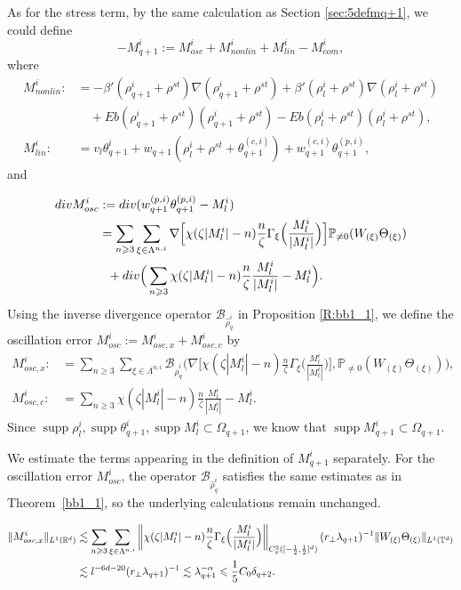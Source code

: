 \documentclass[10pt,a4paper]{amsart}
\numberwithin{equation}{section}
\DeclareMathOperator{\supp}{supp}
\def\[{{\Big[}}
\def\]{{\Big]}}
\def\({{\Big(}}
\def\){{\Big)}}
\newcommand{\norm}[1]{\left\|#1\right\|}
\def\mP{{\mathbb P}}
\def\geq{\geqslant}
\def\leq{\leqslant}
\def\div{\mathord{{\rm div}}}
\def\[{{\Big[}}
\def\]{{\Big]}}
\def\({{\Big(}}
\def\){{\Big)}}
\def\geq{\geqslant}
\def\leq{\leqslant}
\def\div{\mathord{{\rm div}}}
\begin{document}
 
 As for the stress term, by the same calculation as Section \ref{sec:5defmq+1}, we could  define 
$$-{M}^i _{q+1}:=M^i_{osc}+M^i_{nonlin}+M^i_{lin}-M^i_{com},$$
where 
\begin{align*}
M^i_{nonlin}: 
&=-  \beta'(\rho^i_{q+1}+\rho^{st} )  \nabla (\rho^i_{q+1}+\rho^{st} )+ \beta'(\rho^i_{l}+\rho^{st} )\nabla( \rho^i_{l}+\rho^{st}) \\
&\quad +Eb( \rho_{q+1}^i+\rho^{st})( \rho_{q+1}^i+\rho^{st})  -Eb(\rho_{l}^i+\rho^{st})(\rho_{l}^i+\rho^{st}) ,\\
M^i_{lin}:&=v_l\theta^i _{q+1}+w_{q+1}  (\rho^i_l+\rho^{st}+\theta_{q+1}^{(c,i)})+w_{q+1}^{(c,i)}\theta_{q+1}^{(p,i)},
\end{align*}  
and 

\begin{align*}
 \div M^i_{osc}&:=\div (w_{q+1}^{(p,i)}\theta_{q+1}^{(p,i)}-M^i_l)\\
 &=\sum_{n\geq3}\sum_{\xi\in\Lambda^{n,i}}\nabla\[\chi(\zeta |M^i_l|-n)\frac{n}{\zeta }\Gamma_{\xi}\(\frac{M^i_l}{|M^i_l|}\)\]\mP_{\neq0}(W_{ (\xi)}\Theta_{ (\xi)})\notag\\
 &\ \ +\div \(\sum_{n\geq3}\chi(\zeta |M^i_l|-n)\frac{n}{\zeta }\frac{M^i_l}{|M^i_l|}-M^i_l\). 
\end{align*} 
Using  the inverse divergence operator  $\mathcal{B}_{\hat{\rho}_q^i}$ in Proposition \ref{R:bb1_1}, we  define  the  oscillation error $M^i_{osc}:=M^i_{osc,x}+M^i_{osc,c}$  by
\begin{align*} M^i_{osc,x}:&=\sum_{n\geq3}\sum_{\xi\in\Lambda^{n,i}}\mathcal{B}_{\hat{\rho}_q^i}\(\nabla\[\chi(\zeta |M^i_l|-n)\frac{n}{\zeta }\Gamma_{\xi}\(\frac{M^i_l}{|M^i_l|}\)\],\mathbb{P}_{\neq0}(W_{ (\xi)}\Theta_{ (\xi)})\),\\
   M^i_{osc,c}:&=\sum_{n\geq3}\chi(\zeta |M^i_l|-n)\frac{n}{\zeta }\frac{M^i_l}{|M^i_l|}- M^i_l.
\end{align*}
Since $\supp \rho^i_l,\supp \theta_{q+1}^i,\supp M_l^i\subset\Omega_{q+1}$, we know that $\supp M_{q+1}^i\subset\Omega_{q+1}$. 




We estimate the terms appearing in the definition of $M^i_{q+1}$ separately. For the oscillation error $M^i_{ {osc}}$, the operator $\mathcal{B}_{\hat{\rho}_q^i}$ satisfies the same estimates as in Theorem~\ref{bb1_1}, so the underlying calculations remain unchanged.

\begin{align}
\|M^i_{osc,x} \|_{L^1(\mathbb{R}^d)}
&\lesssim\sum_{n\geq3}\sum_{\xi\in\Lambda^{n,i}}\norm{\chi(\zeta |M^i_l|-n)\frac{n}{\zeta }\Gamma_{\xi}\(\frac{M^i_l}{|M^i_l|}\)}_{C_{x}^2([-\frac12,\frac12]^d)}(r_\perp\lambda_{q+1})^{-1}\|W_{ (\xi)}\Theta_{ (\xi)}\|_{L^{1}(\mathbb{T}^d)}\notag\\
&\lesssim l^{-6d-20}(r_\perp\lambda_{q+1})^{-1} 
\lesssim  \lambda_{q+1}^{-\alpha}\leq  \frac15C_0\delta_{q+2}.\notag
\end{align} 
\end{document}

